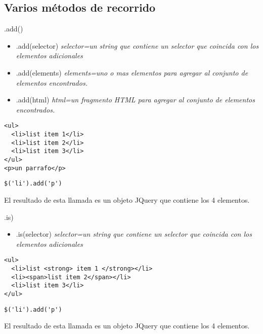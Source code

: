 \subsection{Varios métodos de recorrido} %

\begin{frame}[fragile]{.add()} %
\begin{itemize}
    \item .add(selector) \textit{ selector=un string que contiene un selector que coincida con los elementos adicionales}
    \item .add(elements) \textit{ elements=uno o mas elementos para agregar al
    conjunto de elementos encontrados.}
    \item .add(html) \textit{ html=un fragmento HTML para agregar al conjunto
    de elementos encontrados.}
\end{itemize}
\begin{lstlisting}
<ul>
  <li>list item 1</li>
  <li>list item 2</li>
  <li>list item 3</li>
</ul>
<p>un parrafo</p>
\end{lstlisting}
\begin{lstlisting}
$('li').add('p')
\end{lstlisting}
El resultado de esta llamada es un objeto JQuery que contiene los 4 elementos.
\end{frame}

\begin{frame}[fragile]{.is)} %
\begin{itemize}
    \item .is(selector) \textit{ selector=un string que contiene un selector que coincida con los elementos adicionales}
\end{itemize}
\begin{lstlisting}
<ul>
  <li>list <strong> item 1 </strong></li>
  <li><span>list item 2</span></li>
  <li>list item 3</li>
</ul>
\end{lstlisting}
\begin{lstlisting}
$('li').add('p')
\end{lstlisting}
El resultado de esta llamada es un objeto JQuery que contiene los 4 elementos.
\end{frame}


